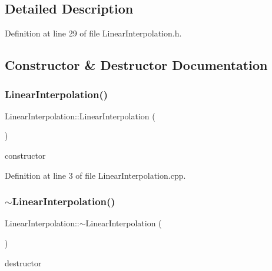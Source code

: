 \subsection{Detailed Description}


Definition at line 29 of file Linear\+Interpolation.\+h.



\subsection{Constructor \& Destructor Documentation}
\mbox{\label{class_linear_interpolation_aaae2ec77e7767bb5fc7ca34a6e1197f1}} 
\subsubsection{\texorpdfstring{Linear\+Interpolation()}{LinearInterpolation()}}
{\footnotesize\ttfamily Linear\+Interpolation\+::\+Linear\+Interpolation (\begin{DoxyParamCaption}{ }\end{DoxyParamCaption})}



constructor 



Definition at line 3 of file Linear\+Interpolation.\+cpp.

\mbox{\label{class_linear_interpolation_a36a34fa39c430e05bdc073c1ac9ad4df}} 
\subsubsection{\texorpdfstring{$\sim$\+Linear\+Interpolation()}{~LinearInterpolation()}}
{\footnotesize\ttfamily Linear\+Interpolation\+::$\sim$\+Linear\+Interpolation (\begin{DoxyParamCaption}{ }\end{DoxyParamCaption})}



destructor 



